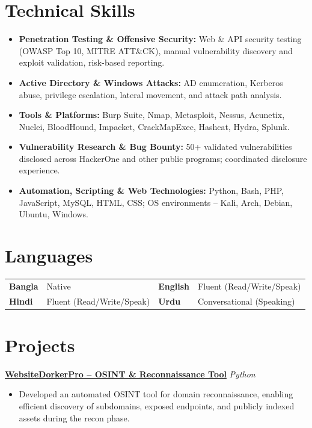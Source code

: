 \documentclass[10pt,a4paper]{article}
\newcommand{\project}[2]{
    \textbf{#1} \hfill \textit{#2}\\[-2pt]
}
\begin{document}
\section{Technical Skills}

\begin{itemize}
    \item \textbf{Penetration Testing \& Offensive Security:} Web \& API security testing (OWASP Top 10, MITRE ATT\&CK), manual vulnerability discovery and exploit validation, risk-based reporting.
    \item \textbf{Active Directory \& Windows Attacks:} AD enumeration, Kerberos abuse, privilege escalation, lateral movement, and attack path analysis.
    \item \textbf{Tools \& Platforms:} Burp Suite, Nmap, Metasploit, Nessus, Acunetix, Nuclei, BloodHound, Impacket, CrackMapExec, Hashcat, Hydra, Splunk.
    \item \textbf{Vulnerability Research \& Bug Bounty:} 50+ validated vulnerabilities disclosed across HackerOne and other public programs; coordinated disclosure experience.
    \item \textbf{Automation, Scripting \& Web Technologies:} Python, Bash, PHP, JavaScript, MySQL, HTML, CSS; OS environments -- Kali, Arch, Debian, Ubuntu, Windows.
\end{itemize}

\section{Languages}

\begin{tabularx}{\textwidth}{@{}X X X X@{}}
\textbf{Bangla} & Native &
\textbf{English} & Fluent (Read/Write/Speak) \\
\textbf{Hindi} & Fluent (Read/Write/Speak) &
\textbf{Urdu} & Conversational (Speaking)
\end{tabularx}

\section{Projects}

\project{\href{https://pypi.org/project/website-dorker-pro/}{WebsiteDorkerPro -- OSINT \& Reconnaissance Tool}}{Python}
\begin{itemize}
    \item Developed an automated OSINT tool for domain reconnaissance, enabling efficient discovery of subdomains, exposed endpoints, and publicly indexed assets during the recon phase.
\end{itemize}
\end{document}
